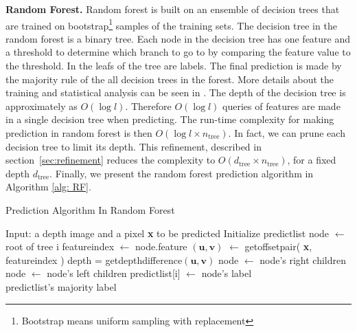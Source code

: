 \textbf{Random Forest.} Random forest is built on an ensemble of decision trees that are trained on  bootstrap\footnote{Bootstrap means uniform   sampling with replacement} samples of the training sets. The decision tree in the random forest is a binary tree. Each node in the decision tree has one feature and a threshold to determine which branch to go to by comparing the feature value to the threshold. In the leafs of the tree are labels. The final prediction is made by the majority rule of the all decision trees in the forest. More details about the training and statistical analysis can be seen in \cite{lepetit2005}. The depth of the decision tree is approximately as $O(\log l)$. Therefore $O(\log l)$ queries of features are made in a single decision tree when predicting. The run-time complexity for making prediction in random forest is then $O(\log l \times n_{\text{tree}})$. In fact, we can prune each decision tree to limit its depth. This refinement, described in section~\ref{sec:refinement} reduces the complexity to $O(d_{\text{tree}}\times n_{\text{tree}})$, for a fixed depth $d_{\text{tree}}$. Finally, we present the random forest prediction algorithm in Algorithm \ref{alg: RF}.


\begin{algorithm}
 \caption{Prediction Algorithm In Random Forest}
 \label{alg: RF}
\begin{algorithmic}

\State Input: a depth image and a pixel \textbf{x} to be predicted
\State Initialize predict\textunderscore list
     \State node $\leftarrow$ root of tree i
	   \State feature\textunderscore index $\gets$ node.feature
       \State $(\textbf{u}, \textbf{v})$ $\gets$ get\textunderscore offset\textunderscore pair( \textbf{x}, feature\textunderscore index )
	   \State depth = get\textunderscore depth\textunderscore difference$(\textbf{u}, \textbf{v})$
	      \State node $\gets$ node's right children	
	   \Else
	      \State node $\gets$ node's left children
       \EndIf
    \EndWhile
    \State predict\textunderscore list[i] $\gets$ node's label
  \EndFor
\\
\Return predict\textunderscore list's majority label
 
\end{algorithmic}
\end{algorithm}


